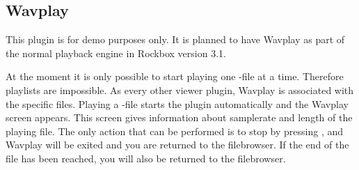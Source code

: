 \subsection{Wavplay}
This plugin is for demo purposes only. It is planned to have 
Wavplay as part of the normal playback engine in Rockbox version 3.1.

At the moment it is only possible to start playing one -file at a 
time. Therefore playlists are impossible. As every other viewer plugin, Wavplay
is associated with the specific files. Playing a -file starts the 
plugin automatically and the Wavplay screen 
appears. This screen gives information about samplerate and length of the 
playing file. 
The only action that can be performed is to stop by pressing \ButtonOff, and 
Wavplay will be exited and you are returned to the  filebrowser. If the end of 
the file has been reached, you will also be returned to the filebrowser.